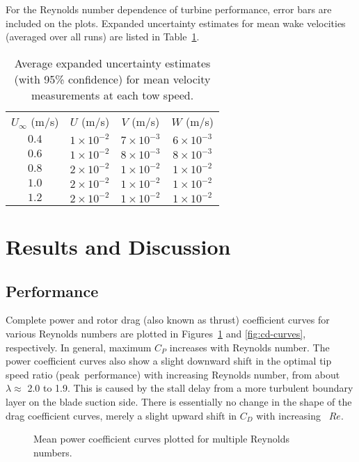 For the Reynolds number dependence of turbine performance, error bars are
included on the plots. Expanded uncertainty estimates for mean wake velocities
(averaged over all runs) are listed in Table~\ref{tab:vel-unc}.

\begin{table}[ht]
\centering
\begin{tabular}{cccc}
    $U_\infty$ (m/s) &   $U$ (m/s) &  $V$ (m/s) &  $W$ (m/s) \\
    $0.4$ & $1 \times 10^{-2}$ & $7 \times 10^{-3}$ & $6 \times 10^{-3}$ \\
    $0.6$ & $1 \times 10^{-2}$ & $8 \times 10^{-3}$ & $8 \times 10^{-3}$ \\
    $0.8$ & $2 \times 10^{-2}$ & $1 \times 10^{-2}$ & $1 \times 10^{-2}$ \\
    $1.0$ & $2 \times 10^{-2}$ & $1 \times 10^{-2}$ & $1 \times 10^{-2}$ \\
    $1.2$ & $2 \times 10^{-2}$ & $1 \times 10^{-2}$ & $1 \times 10^{-2}$ \\
\end{tabular}
\caption{Average expanded uncertainty estimates (with 95\% confidence) for mean
    velocity measurements at each tow speed.}

\label{tab:vel-unc}
\end{table}


\section{Results and Discussion}

\subsection{Performance}

Complete power and rotor drag (also known as thrust) coefficient curves for
various Reynolds numbers are plotted in Figures~\ref{fig:cp-curves} and
\ref{fig:cd-curves}, respectively. In general, maximum $C_P$ increases with
Reynolds number. The power coefficient curves also show a slight downward shift
in the optimal tip speed ratio (peak~performance) with increasing Reynolds
number, from about $\lambda \approx$ 2.0 to 1.9. This is caused by the stall
delay from a more turbulent boundary layer on the blade suction side. There is
essentially no change in the shape of the drag coefficient curves, merely a
slight upward shift in $C_D$ with increasing~ $Re$.

\begin{figure}[ht]
\centering


\caption{Mean power coefficient curves plotted for multiple Reynolds numbers.}

\label{fig:cp-curves}
\end{figure}
\unskip

